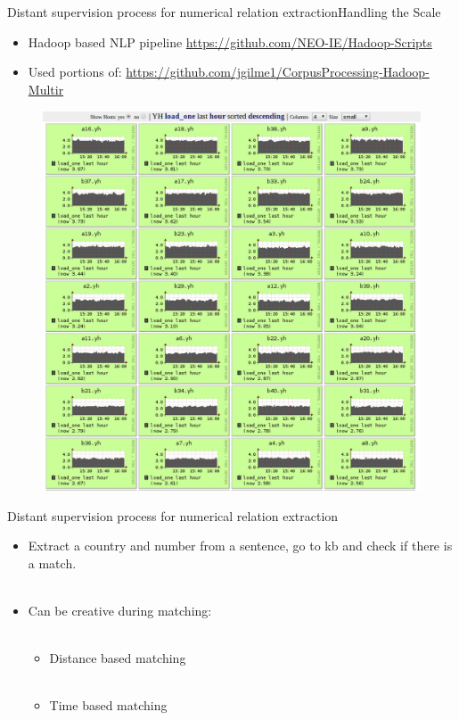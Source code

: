 \documentclass{beamer}
\begin{document}
\begin{frame}{Distant supervision process for numerical relation extraction}{Handling the Scale}
 
\begin{itemize}
 \item Hadoop based NLP pipeline {\tiny \url{https://github.com/NEO-IE/Hadoop-Scripts}}
 \item Used portions of: {\tiny \url{https://github.com/jgilme1/CorpusProcessing-Hadoop-Multir}}
\end{itemize}

\begin{figure}[h]
 \centering
 \includegraphics[bb=0 0 1680 1050,scale=0.2]{./imgs/clusterworking.png}
\end{figure}

\end{frame}


\begin{frame}{Distant supervision process for numerical relation extraction}
 \begin{itemize}
  \item Extract a country and number from a sentence, go to kb and check if there is a match. \\~\\
  \item Can be creative during matching: \\~\\
  \begin{itemize} 
   \item Distance based matching \\~\\
   \item Time based matching 
  \end{itemize}
 \end{itemize}
\end{frame}
\end{document}
